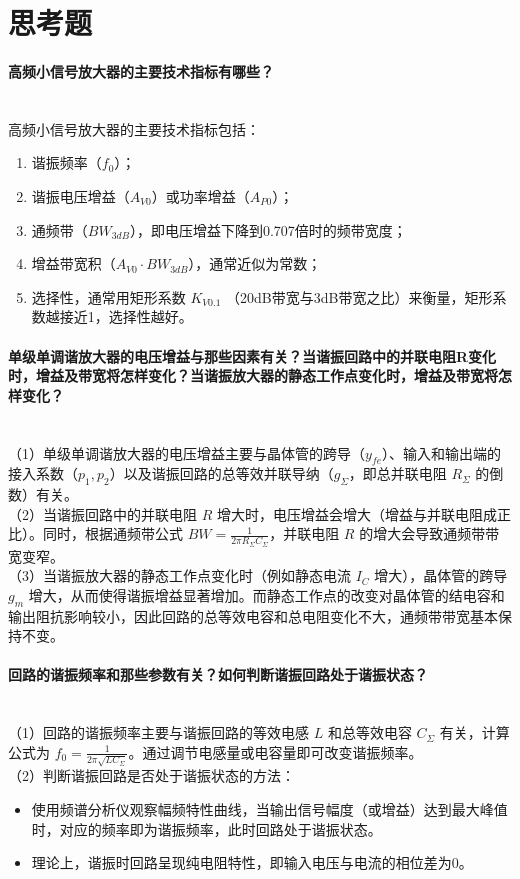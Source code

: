 \documentclass[12pt]{article}
\begin{document}
\section{思考题}
\paragraph{高频小信号放大器的主要技术指标有哪些？}~\\
高频小信号放大器的主要技术指标包括：
\begin{enumerate}
	\item 谐振频率（$f_0$）；
	\item 谐振电压增益（$A_{V0}$）或功率增益（$A_{P0}$）；
	\item 通频带（$BW_{3dB}$），即电压增益下降到0.707倍时的频带宽度；
	\item 增益带宽积（$A_{V0} \cdot BW_{3dB}$），通常近似为常数；
	\item 选择性，通常用矩形系数 $K_{V0.1}$ （20dB带宽与3dB带宽之比）来衡量，矩形系数越接近1，选择性越好。
\end{enumerate}

\paragraph{单级单调谐放大器的电压增益与那些因素有关？当谐振回路中的并联电阻R变化时，增益及带宽将怎样变化？当谐振放大器的静态工作点变化时，增益及带宽将怎样变化？}~\\
（1）单级单调谐放大器的电压增益主要与晶体管的跨导（$y_{fe}$）、输入和输出端的接入系数（$p_1, p_2$）以及谐振回路的总等效并联导纳（$g_{\Sigma}$，即总并联电阻 $R_{\Sigma}$ 的倒数）有关。\\
（2）当谐振回路中的并联电阻 $R$ 增大时，电压增益会增大（增益与并联电阻成正比）。同时，根据通频带公式 $BW = \frac{1}{2\pi R_{\Sigma} C_{\Sigma}}$，并联电阻 $R$ 的增大会导致通频带带宽变窄。\\
（3）当谐振放大器的静态工作点变化时（例如静态电流 $I_C$ 增大），晶体管的跨导 $g_m$ 增大，从而使得谐振增益显著增加。而静态工作点的改变对晶体管的结电容和输出阻抗影响较小，因此回路的总等效电容和总电阻变化不大，通频带带宽基本保持不变。

\paragraph{回路的谐振频率和那些参数有关？如何判断谐振回路处于谐振状态？}~\\
（1）回路的谐振频率主要与谐振回路的等效电感 $L$ 和总等效电容 $C_{\Sigma}$ 有关，计算公式为 $f_0 = \frac{1}{2\pi\sqrt{LC_{\Sigma}}}$。通过调节电感量或电容量即可改变谐振频率。\\
（2）判断谐振回路是否处于谐振状态的方法：
\begin{itemize}
	\item 使用频谱分析仪观察幅频特性曲线，当输出信号幅度（或增益）达到最大峰值时，对应的频率即为谐振频率，此时回路处于谐振状态。
	\item 理论上，谐振时回路呈现纯电阻特性，即输入电压与电流的相位差为0。
\end{itemize}
\end{document}

